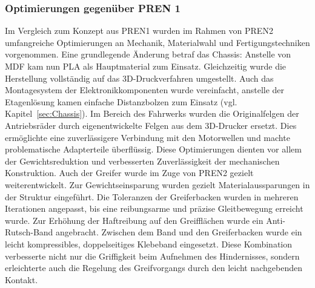 \documentclass[main.tex]{subfiles} %
\begin{document}

\subsubsection{Optimierungen gegenüber PREN 1}

Im Vergleich zum Konzept aus PREN1 wurden im Rahmen von PREN2 umfangreiche Optimierungen an Mechanik, 
Materialwahl und Fertigungstechniken vorgenommen.
Eine grundlegende Änderung betraf das Chassis: Anstelle von MDF kam nun PLA als Hauptmaterial zum Einsatz. 
Gleichzeitig wurde die Herstellung vollständig auf das 3D-Druckverfahren umgestellt.
Auch das Montagesystem der Elektronikkomponenten wurde vereinfacht, anstelle der Etagenlösung 
kamen einfache Distanzbolzen zum Einsatz (vgl. Kapitel~\ref{sec:Chassis}).
Im Bereich des Fahrwerks wurden die Originalfelgen der Antriebsräder durch eigenentwickelte 
Felgen aus dem 3D-Drucker ersetzt. Dies ermöglichte eine zuverlässigere Verbindung mit den Motorwellen und 
machte problematische Adapterteile überflüssig. Diese Optimierungen dienten vor allem der Gewichtsreduktion und 
verbesserten Zuverlässigkeit der mechanischen Konstruktion.
Auch der Greifer wurde im Zuge von PREN2 gezielt weiterentwickelt. Zur Gewichtseinsparung wurden 
gezielt Materialaussparungen in der Struktur eingeführt. Die Toleranzen der Greiferbacken wurden 
in mehreren Iterationen angepasst, bis eine reibungsarme und präzise Gleitbewegung erreicht wurde.
Zur Erhöhung der Haftreibung auf den Greifflächen wurde ein Anti-Rutsch-Band angebracht. 
Zwischen dem Band und den Greiferbacken wurde ein leicht kompressibles, doppelseitiges Klebeband eingesetzt. 
Diese Kombination verbesserte nicht nur die Griffigkeit beim Aufnehmen des Hindernisses, sondern 
erleichterte auch die Regelung des Greifvorgangs durch den leicht nachgebenden Kontakt.
\end{document}
